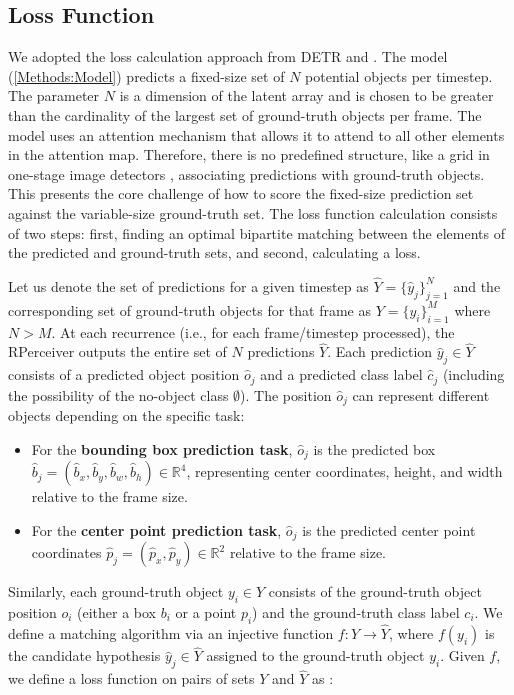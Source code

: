 
\subsection{Loss Function} \label{Methods:LossFunction}

We adopted the loss calculation approach from DETR \cite{carionEndtoEndObjectDetection2020} and \cite{stewartEndtoendPeopleDetection2015}. The model (\ref{Methods:Model}) predicts a fixed-size set of $N$ potential objects per timestep. The parameter $N$ is a dimension of the latent array and is chosen to be greater than the cardinality of the largest set of ground-truth objects per frame. The model uses an attention mechanism that allows it to attend to all other elements in the attention map. Therefore, there is no predefined structure, like a grid in one-stage image detectors \cite{redmonYouOnlyLook2016}, associating predictions with ground-truth objects. This presents the core challenge of how to score the fixed-size prediction set against the variable-size ground-truth set. The loss function calculation consists of two steps: first, finding an optimal bipartite matching between the elements of the predicted and ground-truth sets, and second, calculating a loss.

Let us denote the set of predictions for a given timestep as $ \hat{Y} = \{\hat{y}_j\}_{j=1}^N $ and the corresponding set of ground-truth objects for that frame as $ Y = \{y_i\}_{i=1}^M $ where $ N > M $. At each recurrence (i.e., for each frame/timestep processed), the RPerceiver outputs the entire set of $N$ predictions $\hat{Y}$. Each prediction $\hat{y}_j \in \hat{Y}$ consists of a predicted object position $\hat{o}_j$ and a predicted class label $\hat{c}_j$ (including the possibility of the no-object class $\emptyset$). The position $\hat{o}_j$ can represent different objects depending on the specific task:
\begin{itemize}
    \item For the \textbf{bounding box prediction task}, $\hat{o}_j$ is the predicted box $\hat{b}_j = (\hat{b}_x, \hat{b}_y, \hat{b}_w, \hat{b}_h) \in \mathbb{R}^4$, representing center coordinates, height, and width relative to the frame size.
    \item For the \textbf{center point prediction task}, $\hat{o}_j$ is the predicted center point coordinates $\hat{p}_j = (\hat{p}_x, \hat{p}_y) \in \mathbb{R}^2$ relative to the frame size.
\end{itemize}
Similarly, each ground-truth object $y_i \in Y$ consists of the ground-truth object position $o_i$ (either a box $b_i$ or a point $p_i$) and the ground-truth class label $c_i$.
We define a matching algorithm via an injective function $f: Y \rightarrow \hat{Y}$, where $f(y_i)$ is the candidate hypothesis $\hat{y}_j \in \hat{Y}$ assigned to the ground-truth object $y_i$. Given $f$, we define a loss function on pairs of sets $Y$ and $\hat{Y}$ as \cite{stewartEndtoendPeopleDetection2015}:

